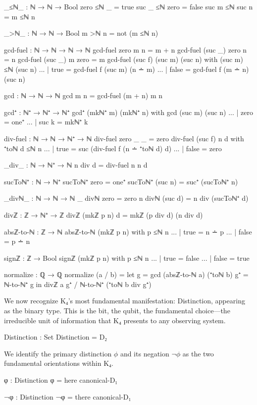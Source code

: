 \documentclass[11pt,a4paper]{book}
\begin{document}
\begin{code}
_≤ℕ_ : ℕ → ℕ → Bool
zero  ≤ℕ _     = true
suc _ ≤ℕ zero  = false
suc m ≤ℕ suc n = m ≤ℕ n

_>ℕ_ : ℕ → ℕ → Bool
m >ℕ n = not (m ≤ℕ n)

gcd-fuel : ℕ → ℕ → ℕ → ℕ
gcd-fuel zero    m n       = m + n
gcd-fuel (suc _) zero n    = n
gcd-fuel (suc _) m zero    = m
gcd-fuel (suc f) (suc m) (suc n) with (suc m) ≤ℕ (suc n)
... | true  = gcd-fuel f (suc m) (n ∸ m)
... | false = gcd-fuel f (m ∸ n) (suc n)

gcd : ℕ → ℕ → ℕ
gcd m n = gcd-fuel (m + n) m n

gcd⁺ : ℕ⁺ → ℕ⁺ → ℕ⁺
gcd⁺ (mkℕ⁺ m) (mkℕ⁺ n) with gcd (suc m) (suc n)
... | zero  = one⁺
... | suc k = mkℕ⁺ k


div-fuel : ℕ → ℕ → ℕ⁺ → ℕ
div-fuel zero    _       _ = zero
div-fuel (suc f) n d with ⁺toℕ d ≤ℕ n
... | true  = suc (div-fuel f (n ∸ ⁺toℕ d) d)
... | false = zero

_div_ : ℕ → ℕ⁺ → ℕ
n div d = div-fuel n n d

sucToℕ⁺ : ℕ → ℕ⁺
sucToℕ⁺ zero = one⁺
sucToℕ⁺ (suc n) = suc⁺ (sucToℕ⁺ n)


_divℕ_ : ℕ → ℕ → ℕ
_ divℕ zero = zero
n divℕ (suc d) = n div (sucToℕ⁺ d)

divℤ : ℤ → ℕ⁺ → ℤ
divℤ (mkℤ p n) d = mkℤ (p div d) (n div d)

absℤ-to-ℕ : ℤ → ℕ
absℤ-to-ℕ (mkℤ p n) with p ≤ℕ n
... | true  = n ∸ p
... | false = p ∸ n

signℤ : ℤ → Bool
signℤ (mkℤ p n) with p ≤ℕ n
... | true  = false
... | false = true

normalize : ℚ → ℚ
normalize (a / b) = 
  let g = gcd (absℤ-to-ℕ a) (⁺toℕ b)
      g⁺ = ℕ-to-ℕ⁺ g
  in divℤ a g⁺ / ℕ-to-ℕ⁺ (⁺toℕ b div g⁺)

\end{code}

We now recognize K₄'s most fundamental manifestation: Distinction, appearing as the binary type. This is the bit, the qubit, the fundamental choice—the irreducible unit of information that K₄ presents to any observing system.

\begin{code}
Distinction : Set
Distinction = D₂
\end{code}

We identify the primary distinction $\phi$ and its negation $\neg\phi$ as the two fundamental orientations within K₄.

\begin{code}
φ : Distinction
φ = here canonical-D₁

¬φ : Distinction
¬φ = there canonical-D₁
\end{code}
\end{document}
